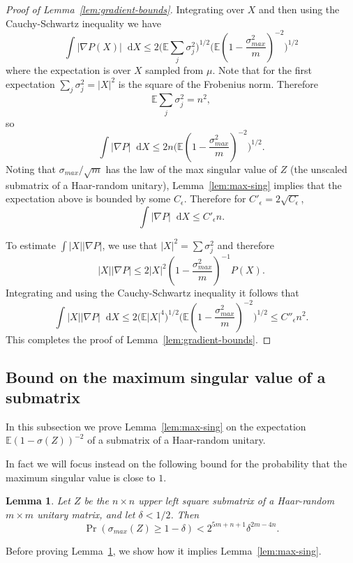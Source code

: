 \documentclass[11pt]{article}
\theoremstyle{plain}
\theoremstyle{plain}
\newtheorem{lem}{Lemma}
\theoremstyle{plain}
\theoremstyle{plain}
\theoremstyle{plain}
\theoremstyle{plain}
\theoremstyle{plain}
\theoremstyle{remark}
\theoremstyle{remark}
\theoremstyle{plain}
\theoremstyle{plain}
\theoremstyle{plain}
\theoremstyle{plain}
\newcommand{\eps}{\epsilon}
\newcommand{\diff}{\mathop{}\!\mathrm{d}}
\newcommand{\Expec}{\mathbb E}
\newcommand{\Prob}{\Pr}
\begin{document}
\begin{proof}[Proof of Lemma~\ref{lem:gradient-bounds}]
Integrating over $X$ and then using the Cauchy-Schwartz inequality we have
\[
\int |\nabla P(X)|\diff X
\leq 2 \big(\Expec \sum_j \sigma_j^2\big)^{1/2}\big(\Expec (1-\frac{\sigma_{max}^2}{m})^{-2}\big)^{1/2}
\]
where the expectation is over $X$ sampled from $\mu$.  Note that for the first expectation
$\sum_j \sigma_j^2 = |X|^2$ is the square of the Frobenius norm.  
Therefore
\[
\Expec \sum_j \sigma_j^2 = n^2,
\]
so
\[
\int |\nabla P| \diff X \leq 2 n \big(\Expec (1-\frac{\sigma_{max}^2}{m})^{-2}\big)^{1/2}.
\]
Noting that $\sigma_{max}/\sqrt{m}$ has the law of the max singular value of $Z$ (the unscaled submatrix of a Haar-random unitary), 
Lemma~\ref{lem:max-sing} implies that the expectation above is bounded by some $C_\eps$.  Therefore for $C'_\eps = 2\sqrt{C_\eps}$,
\begin{equation}
\int |\nabla P|\diff X \leq C'_\eps n.
\end{equation}

To estimate $\int |X||\nabla P|$, we use that $|X|^2=\sum \sigma_j^2$ and therefore
\[
|X||\nabla P| \leq 2 |X|^2 (1-\frac{\sigma_{max}^2}{m})^{-1} P(X).
\]
Integrating and using the Cauchy-Schwartz inequality it follows that
\[
\int |X||\nabla P| \diff X \leq 2 \big(\Expec |X|^4\big)^{1/2} \big(\Expec (1-\frac{\sigma_{max}^2}{m})^{-2}\big)^{1/2}
\leq C''_\eps n^2.
\]
This completes the proof of Lemma~\ref{lem:gradient-bounds}.
\end{proof}


\subsection{Bound on the maximum singular value of a submatrix}
In this subsection we prove Lemma~\ref{lem:max-sing}
 on the expectation $\Expec (1-\sigma(Z))^{-2}$ of a submatrix
 of a Haar-random unitary.  

In fact we will focus instead on the following  bound for the probability that the maximum singular value is close to $1$.

\begin{lem}
\label{lem:prob-max-sing}
Let $Z$ be the $n\times n$ upper left square submatrix of a
Haar-random $m\times m$ unitary matrix, and let $\delta < 1/2$.  Then
\[
\Prob(\sigma_{max}(Z)\geq 1-\delta) < 2^{5m+n+1} \delta^{2m-4n}.
\]
\end{lem}

Before proving Lemma~\ref{lem:prob-max-sing}, we show how it implies Lemma~\ref{lem:max-sing}.
\end{document}
